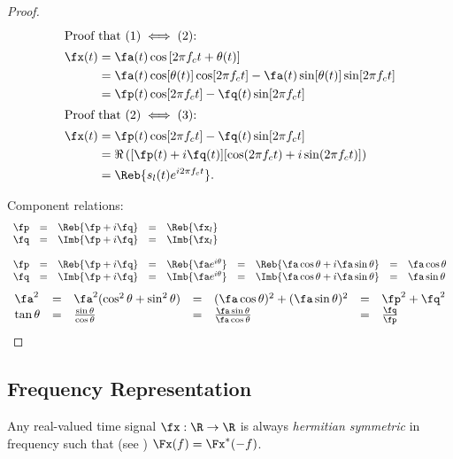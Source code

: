 \begin{proof}

\begin{align*}
  \intertext{Proof that $(1) \iff (2)$: }
   \fx(t)
     &= \fa(t)\cos\left[ 2\pi f_c t + \theta(t) \right]
   \\&= \fa(t)\cos[\theta(t)]\cos[2\pi f_c t] -\fa(t)\sin[\theta(t)]\sin[2\pi f_c t]
   \\&= \fp(t)\cos[2\pi f_c t] -\fq(t)\sin[2\pi f_c t]
  \\
  \intertext{Proof that $(2) \iff (3)$: }
  \fx(t)
    &= \fp(t)\cos[2\pi f_c t] -\fq(t)\sin[2\pi f_c t]
  \\&= \Re\left( [\fp(t)+i\fq(t)][\cos(2\pi f_c t) + i\sin(2\pi f_c t)]\right)
  \\&= \Reb{s_l(t)e^{i2\pi f_c t}}.
\end{align*}

Component relations:
\[\begin{array}{*{12}{l}}
   \fp
     &=& \Reb{\fp + i\fq}
     &=& \Reb{\fx_l}
\\
   \fq
     &=& \Imb{\fp + i\fq}
     &=& \Imb{\fx_l}
\\ \\
   \fp
     &=& \Reb{\fp + i\fq}
     &=& \Reb{\fa e^{i\theta}}
     &=& \Reb{\fa\cos\theta + i\fa\sin\theta}
     &=& \fa\cos\theta
\\
   \fq
     &=& \Imb{\fp + i\fq}
     &=& \Imb{\fa e^{i\theta}}
     &=& \Imb{\fa\cos\theta + i\fa\sin\theta}
     &=& \fa\sin\theta
\end{array}\]
\[\begin{array}{*{12}{l}}
   \fa^2
     &=& \fa^2 (\cos^2\theta + \sin^2\theta)
     &=& (\fa \cos\theta)^2 + (\fa\sin\theta)^2
     &=& \fp^2 + \fq^2
\\
   \tan\theta
     &=& \frac{\sin\theta}{\cos\theta}
     &=& \frac{\fa\sin\theta}{\fa\cos\theta}
     &=& \frac{\fq}{\fp}
\end{array}\]

\end{proof}


\subsection{Frequency Representation}
Any real-valued time signal $\fx:\R\to\R$
is always {\em hermitian symmetric} in frequency
such that (see )
$\Fx(f) =  \Fx^\ast(-f)$.

